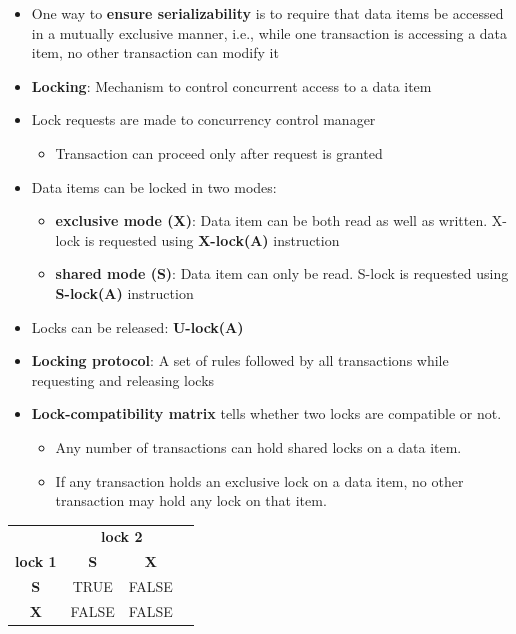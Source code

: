 \begin{itemize}[label=\(\rhd\)]
    \item One way to \textbf{ensure serializability} is to require that data items be accessed in a mutually exclusive manner, i.e., while one transaction is accessing a data item, no other transaction can modify it
    \item \textbf{Locking}: Mechanism to control concurrent access to a data item
    \item Lock requests are made to concurrency control manager
    \begin{itemize}[label=\(\rhd\)]
        \item Transaction can proceed only after request is granted
    \end{itemize}
    \item Data items can be locked in two modes:
    \begin{itemize}[label=\(\rhd\)]
        \item \textbf{exclusive mode (X)}: Data item can be both read as well as written. X-lock is requested using \textbf{X-lock(A)} instruction
        \item \textbf{shared mode (S)}: Data item can only be read. S-lock is requested using \textbf{S-lock(A)} instruction
    \end{itemize}
    \item Locks can be released: \textbf{U-lock(A)}
    \item \textbf{Locking protocol}: A set of rules followed by all transactions while requesting and releasing locks
\end{itemize}
\begin{minipage}{0.55\textwidth}
\begin{itemize}[label=\(\rhd\)]
    \item \textbf{Lock-compatibility matrix} tells whether two locks are compatible or not.
    \begin{itemize}[label=\(\rhd\)]
        \item Any number of transactions can hold shared locks on a data item.
        \item If any transaction holds an exclusive lock on a data item, no other transaction may hold any lock on that item.
    \end{itemize}
\end{itemize}
\end{minipage}
\hfill
\begin{minipage}{0.4\textwidth}
    \centering
    \begin{tabular}{|c|c|c|c|}
        \hline
        \cellcolor{gray!30} & \multicolumn{2}{c|}{\cellcolor{gray!30}\textbf{lock 2}} \\ \cline{2-3}
        \multirow{-2}{*}{\cellcolor{gray!30}\textbf{lock 1}} & \cellcolor{gray!30}\textbf{S} & \cellcolor{gray!30}\textbf{X} \\ \hline
        \cellcolor{gray!30}\textbf{S} & TRUE & FALSE \\ \hline
        \cellcolor{gray!30}\textbf{X} & FALSE & FALSE \\ \hline
    \end{tabular}
\end{minipage}

